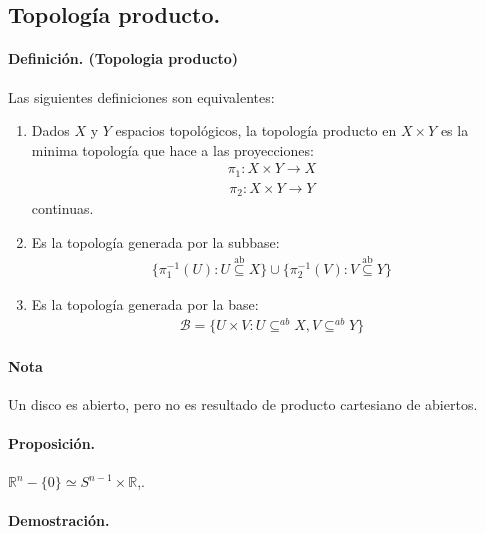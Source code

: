 \subsection{Topología producto.}

\paragraph{\textbf{Definición. (Topologia producto)}} 
Las siguientes definiciones son equivalentes:
\begin{enumerate}[label=(\roman*)]
  \item Dados $X$ y $Y$ espacios topológicos, la topología producto en $X \times Y$  es la minima topología que hace a las proyecciones:
  \begin{align*}
    \pi_1: X \times Y \to X
  \end{align*}
  \begin{align*}
    \pi_2: X \times Y \to Y
  \end{align*}  
  continuas.

  \item Es la topología generada por la subbase:
  \begin{align*}
    \{
   \pi_1^{-1}(U) : U  \overset{\text{ab}}\subseteq X \} \cup \{
      \pi_2^{-1}(V) : V  \overset{\text{ab}}\subseteq Y \}
  \end{align*}
  \item Es la topología generada por la base:
  \begin{align*}
    \mathcal B = \{ U \times V : U \subseteq^{ab } X, V \subseteq^{ab } Y \}
  \end{align*}
\end{enumerate}

\paragraph{Nota} Un disco es abierto, pero no es resultado de producto cartesiano de abiertos.


\paragraph{\textbf{Proposición.}} $\mathbb R^n - \{0\}  \simeq  S^{n-1} \times \mathbb R$,.

\paragraph{\textbf{Demostración.}}

